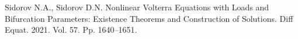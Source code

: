 


\begin{thebibliography}{99}
Sidorov N.A., Sidorov D.N.  {  Nonlinear Volterra Equations with Loads and Bifurcation Parameters: Existence Theorems and Construction of Solutions.} Diff Equat. 2021.  Vol. 57. Pp. 1640--1651.

\end{thebibliography}






%

